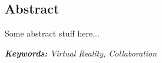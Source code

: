 \begin{center}
\vspace*{1mm}
\section*{\Huge Abstract}
\vspace*{0.7cm}
\end{center}

\noindent Some abstract stuff here...

\bigskip

\noindent \emph{\textbf{Keywords:} Virtual Reality, Collaboration}

\cleardoublepage
